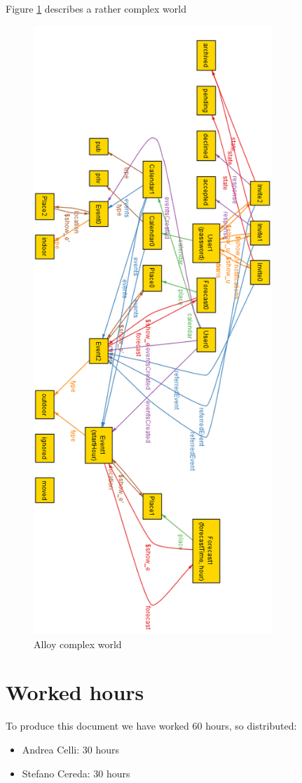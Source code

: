 \documentclass[10pt,a4paper,titlepage]{article}
\begin{document}
Figure \ref{fig:AlloyComplex} describes a rather complex world
\begin{figure}[h!]
\centering
\includegraphics[width=9cm]{./Alloy/ShowComplex.png}
\caption[Complex]{Alloy complex world}
\label{fig:AlloyComplex}
\end{figure}

\clearpage
\section{Worked hours}
To produce this document we have worked 60 hours, so distributed:
\begin{itemize}
\item Andrea Celli: 30 hours
\item Stefano Cereda: 30 hours
\end{itemize}
\end{document}

